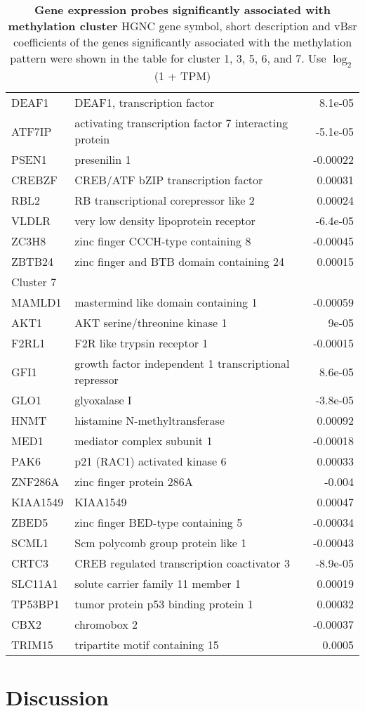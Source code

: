 \documentclass{article}
\begin{document}
\begin{table*}[ht!]
\begin{small}
\begin{tabular}{llr}
  \midrule
  DEAF1 & DEAF1, transcription factor & 8.1e-05 \\ 
  ATF7IP & activating transcription factor 7 interacting protein & -5.1e-05 \\ 
  PSEN1 & presenilin 1 & -0.00022 \\ 
  CREBZF & CREB/ATF bZIP transcription factor & 0.00031 \\ 
  RBL2 & RB transcriptional corepressor like 2 & 0.00024 \\ 
  VLDLR & very low density lipoprotein receptor & -6.4e-05 \\ 
  ZC3H8 & zinc finger CCCH-type containing 8 & -0.00045 \\ 
  ZBTB24 & zinc finger and BTB domain containing 24 & 0.00015 \\ 
  \midrule
  Cluster 7 \\
  \midrule
  MAMLD1 & mastermind like domain containing 1 & -0.00059 \\ 
  AKT1 & AKT serine/threonine kinase 1 & 9e-05 \\ 
  F2RL1 & F2R like trypsin receptor 1 & -0.00015 \\ 
  GFI1 & growth factor independent 1 transcriptional repressor & 8.6e-05 \\ 
  GLO1 & glyoxalase I & -3.8e-05 \\ 
  HNMT & histamine N-methyltransferase & 0.00092 \\ 
  MED1 & mediator complex subunit 1 & -0.00018 \\ 
  PAK6 & p21 (RAC1) activated kinase 6 & 0.00033 \\ 
  ZNF286A & zinc finger protein 286A & -0.004 \\ 
  KIAA1549 & KIAA1549 & 0.00047 \\ 
  ZBED5 & zinc finger BED-type containing 5 & -0.00034 \\ 
  SCML1 & Scm polycomb group protein like 1 & -0.00043 \\ 
  CRTC3 & CREB regulated transcription coactivator 3 & -8.9e-05 \\ 
  SLC11A1 & solute carrier family 11 member 1 & 0.00019 \\ 
  TP53BP1 & tumor protein p53 binding protein 1 & 0.00032 \\ 
  CBX2 & chromobox 2 & -0.00037 \\ 
  TRIM15 & tripartite motif containing 15 & 0.0005 \\ 
   \bottomrule
\end{tabular}
\label{genes}
\end{small}
\caption{\textbf{Gene expression probes significantly associated with methylation cluster} HGNC gene symbol, short description and vBsr coefficients of the genes significantly associated with the methylation pattern were shown in the table for cluster 1, 3, 5, 6, and 7. {\color{red} Use $\log_2$ (1 + TPM)}}
\end{table*}

\section{Discussion}



\end{document}
